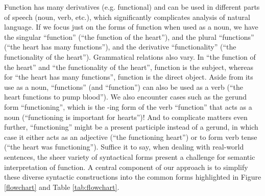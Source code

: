 \documentclass{article}
\begin{document}
Function has many derivatives (e.g. functional) and can be used in different parts of speech (noun, verb, etc.), which significantly complicates analysis of natural language.
If we focus just on the forms of function when used as a noun, we have the singular ``function'' (``the function of the heart''), and the plural ``functions'' (``the heart has many functions''), and the derivative ``functionality'' (``the functionality of the heart'').
Grammatical relations also vary.
In ``the function of the heart'' and ``the functionality of the heart'', function is the subject, whereas for ``the heart has many functions'', function is the direct object.
Aside from its use as a noun, ``functions'' (and ``function'') can also be used as a verb (``the heart functions to pump blood'').
We also encounter cases such as the gerund form ``functioning'', which is the -ing form of the verb ``function'' that acts as a noun (``functioning is important for hearts'')!
And to complicate matters even further, ``functioning'' might be a present participle instead of a gerund, in which case it either acts as an adjective (``the functioning heart'') or to form verb tense (``the heart was functioning''). Suffice it to say, when dealing with real-world sentences, the sheer variety of syntactical forms present a challenge for semantic interpretation of function.
A central component of our approach is to simplify these diverse syntactic constructions into the common forms highlighted in Figure \ref{flowchart} and Table \ref{tab:flowchart}.
 
\end{document}
